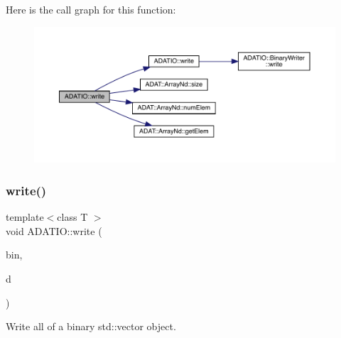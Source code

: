 Here is the call graph for this function\+:\nopagebreak
\begin{figure}[H]
\begin{center}
\leavevmode
\includegraphics[width=350pt]{d0/dba/namespaceADATIO_a0f804d3b56353fad83984a5668212660_cgraph}
\end{center}
\end{figure}
\mbox{\label{namespaceADATIO_a588c700d58adcb2b77399ac18ec9226b}} 
\subsubsection{\texorpdfstring{write()}{write()}\hspace{0.1cm}{\footnotesize\ttfamily [21/25]}}
{\footnotesize\ttfamily template$<$class T $>$ \\
void A\+D\+A\+T\+I\+O\+::write (\begin{DoxyParamCaption}\item[{\mbox{\hyperlink{classADATIO_1_1BinaryWriter}{Binary\+Writer}} \&}]{bin,  }\item[{const std\+::vector$<$ T $>$ \&}]{d }\end{DoxyParamCaption})\hspace{0.3cm}{\ttfamily [inline]}}



Write all of a binary std\+::vector object. 

